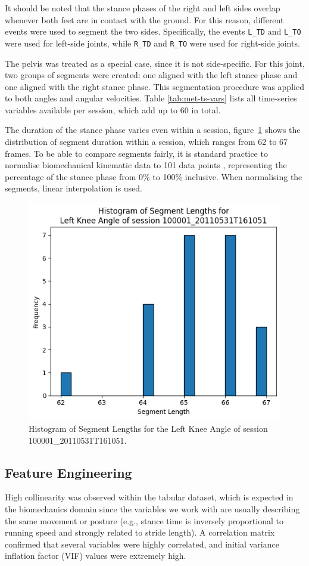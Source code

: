 It should be noted that the stance phases of the right and left sides overlap whenever both feet are in contact with the ground. For this reason, different events were used to segment the two sides. Specifically, the events \texttt{L\_TD} and \texttt{L\_TO} were used for left-side joints, while \texttt{R\_TD} and \texttt{R\_TO} were used for right-side joints.

The pelvis was treated as a special case, since it is not side-specific. For this joint, two groups of segments were created: one aligned with the left stance phase and one aligned with the right stance phase. This segmentation procedure was applied to both angles and angular velocities. Table \ref{tab:met-ts-vars} lists all time-series variables available per session, which add up to 60 in total.

The duration of the stance phase varies even within a session, figure~\ref{fig:met-hist-segments} shows the distribution of segment duration within a session, which ranges from 62 to 67 frames. To be able to compare segments fairly, it is standard practice to normalise biomechanical kinematic data to 101 data points \citep{Crane2010,FuentesJimnez2025}, representing the percentage of the stance phase from 0\% to 100\% inclusive. When normalising the segments, linear interpolation is used.

\begin{figure}[ht]
    \centering
    \includegraphics[width=0.5\columnwidth]{images/hist_segment_lengths_L_knee_angle.png}
    \caption[Histogram of Segment Lengths for a session]{Histogram of Segment Lengths for the Left Knee Angle of session 100001\_20110531T161051.\label{fig:met-hist-segments}}
\end{figure}

\subsection{Feature Engineering}\label{subsec:method-feature-engineering}
High collinearity was observed within the tabular dataset, which is expected in the biomechanics domain since the variables we work with are usually describing the same movement or posture (e.g., stance time is inversely proportional to running speed and strongly related to stride length). A correlation matrix confirmed that several variables were highly correlated, and initial variance inflation factor (VIF) values were extremely high.

